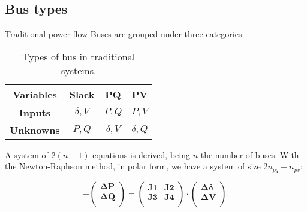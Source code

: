 \subsection{Bus types}
\begin{frame}{Traditional power flow}
Buses are grouped under three categories:

\begin{table}[!htb]\centering
  \caption{Types of bus in traditional systems.}
  \begin{tabular}{cccc}
    \hline
    \textbf{Variables} & \textbf{Slack} & \textbf{PQ} & \textbf{PV} \\
    \hline
    \hline
    \textbf{Inputs} & $\delta, V$ & $P, Q$ & $P, V$ \\
    \textbf{Unknowns} & $P, Q$ & $\delta, V$ & $\delta, Q$ \\
    \hline
  \end{tabular}
  \label{tab:3bus}
\end{table}
A system of $2(n-1)$ equations is derived, being $n$ the number of buses. With the Newton-Raphson method, in polar form, we have a system of size $2n_{pq} + n_{pv}$:

\begin{equation}
  - \begin{pmatrix}
    \bm{\Delta P} \\
    \bm{\Delta Q} \\
   \end{pmatrix} = 
  \begin{pmatrix}
    \bm{J1} & \bm{J2} \\
    \bm{J3} & \bm{J4} \\
  \end{pmatrix}
  \cdot
  \begin{pmatrix}
    \bm{\Delta \delta} \\
    \bm{\Delta V} \\
  \end{pmatrix} .
\end{equation}
\end{frame}


